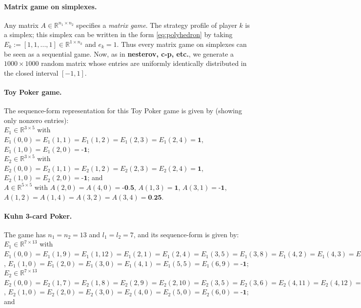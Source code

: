 \documentclass{article} %
\begin{document}
\paragraph{\textbf{Matrix game on simplexes.}}
Any matrix $A \in \mathbb{R}^{n_1 \times n_2}$ specifies a
\textit{matrix game}. The strategy profile of player $k$ is a simplex;
this simplex can be written in the form \eqref{eq:polyhedron} by
taking $E_k := [1, 1, ..., 1] \in \mathbb{R}^{1 \times n_k}$ and $e_k
= 1$. Thus every matrix game on simplexes can be seen as a sequential
game. Now, as in \textbf{nesterov, c-p, etc.}, we generate a $1000
\times 1000$ random matrix whose entries are uniformly identically
distributed in the closed interval $[-1, 1]$.

\paragraph{\textbf{Toy Poker game.}}
The sequence-form representation for this Toy Poker game is given by
(showing only nonzero entries):\\

$E_1 \in \mathbb{R}^{3 \times 5}$ with $E_1(0,0) = E_1(1,1) =
E_1(1,2) = E_1(2,3) = E_1(2,4) = \textbf{1}$,
$E_1(1,0) = E_1(2,0) = \textbf{-1}$; \\

$E_2 \in \mathbb{R}^{3 \times 5}$ with $E_2(0,0) = E_2(1,1) = E_2(1,2)
= E_2(2,3) = E_2(2,4) = \textbf{1}$, $E_2(1,0) = E_2(2,0) =
\textbf{-1}$; and \\

$A \in \mathbb{R}^{5 \times 5}$ with $A(2,0) =
A(4,0) = \textbf{-0.5}$, $A(1,3) = \textbf{1}$, $A(3,1) =
\textbf{-1}$, $A(1,2) = A(1,4) = A(3,2) = A(3,4) = \textbf{0.25}$.


\paragraph{\textbf{Kuhn 3-card Poker.}}
The game has $n_1 = n_2 = 13$ and $l_1 = l_2 = 7$, and its
sequence-form is given by:\\

$E_1 \in \mathbb{R}^{7 \times 13}$ with $E_1(0,0) = E_1(1,9) =
E_1(1,12) = E_1(2,1) = E_1(2,4) = E_1(3,5) =
E_1(3,8) = E_1(4,2) = E_1(4,3) = E_1(5,6) = E_1(5,7) = E_1(6,10) =
E_1(6,11) = \textbf{1}$, $E_1(1,0) = E_1(2,0) = E_1(3,0) = E_1(4,1) =
E_1(5,5) = E_1(6,9) = \textbf{-1}$; \\

 $E_2 \in \mathbb{R}^{7 \times 13}$
$E_2(0,0) = E_2(1,7) = E_2(1,8) = E_2(2,9) = E_2(2,10) = E_2(3,5) =
E_2(3,6) = E_2(4,11) = E_2(4,12) = E_2(5,1) = E_2(5,2) = E_2(6,3) =
E_2(6,4) = \textbf{1}$, $E_2(1,0) = E_2(2,0) = E_2(3,0) = E_2(4,0) =
E_2(5,0) = E_2(6,0) = \textbf{-1}$; and \\
\end{document}
